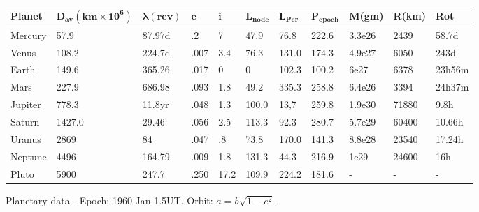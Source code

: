 \begin{figure} [h]
\begin{center}
\begin{tabular} {|lllllllllll|}
\hline
{\bf Planet} & $\mathbf {D_{av}(km \times 10^6)}$ & $\mathbf {\lambda(rev)}$ & 
$\mathbf {e}$ & $\mathbf {i}$  & $\mathbf {L_{node}}$ & $\mathbf {L_{Per}}$ &
$\mathbf {P_{epoch}}$ & {\bf M(gm)} & {\bf R(km)} & {\bf Rot}\\
\hline
Mercury & 57.9 & 87.97d & .2 & 7 & 47.9 & 76.8 & 222.6 & 3.3e26 & 2439 & 58.7d\\
\hline
Venus & 108.2 & 224.7d & .007 & 3.4 & 76.3 & 131.0 & 174.3 & 4.9e27 & 6050 & 243d\\
\hline
Earth & 149.6 & 365.26 & .017 & 0 & 0 & 102.3 & 100.2 & 6e27 & 6378 & 23h56m\\
\hline
Mars & 227.9 & 686.98 & .093 & 1.8 & 49.2 & 335.3 & 258.8 & 6.4e26 & 3394 & 24h37m\\
\hline
Jupiter & 778.3 & 11.8yr & .048 & 1.3 & 100.0 & 13,7 & 259.8 & 1.9e30 & 71880 & 9.8h\\
\hline
Saturn & 1427.0 & 29.46 & .056 & 2.5 & 113.3 & 92.3 & 280.7 & 5.7e29 & 60400 & 10.66h\\
\hline
Uranus & 2869 & 84 & .047 & .8 & 73.8 & 170.0 & 141.3 & 8.8e28  & 23540 & 17.24h\\
\hline
Neptune & 4496 & 164.79 & .009 & 1.8 & 131.3 & 44.3 & 216.9 & 1e29 & 24600 & 16h\\
\hline
Pluto & 5900 & 247.7 & .250 & 17.2 & 109.9 & 224.2 & 181.6 & - & - & - \\
\hline
\end{tabular}
\end{center}
\caption{Planetary data - Epoch: 1960 Jan 1.5UT,
Orbit:  $a = b {\sqrt {1 - e^{2}}}$.}
\end{figure}
